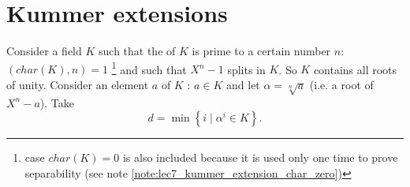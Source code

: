 \section{Kummer extensions}
\label{sec:kummerextension}

Consider a field $K$ such that the
 of $K$ is prime to 
a certain number $n$: $\left(char(K), n\right) = 1$
\footnote{
  case $char(K) = 0$ is also included because it is used only one time
  to prove separability (see note
  \ref{note:lec7_kummer_extension_char_zero}) 
}
and such that $X^n
- 1$ splits in $K$. So $K$ contains all roots of unity. Consider an
element $a$ of $K$ : $a \in K$ and let $\alpha = \sqrt[n]{a}$ (i.e. a
root of $X^n - a$). Take
\begin{equation}
  d = \min{\left\{ i \mid \alpha^i \in
    K\right\}}.
  \label{eq:lec7_d}
\end{equation}

